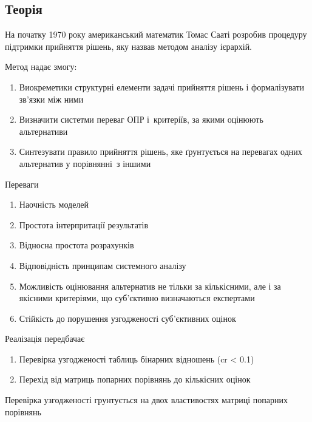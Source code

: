 \subsection{Теорія}
\label{subsec:saaty/theory}

На початку 1970 року американський математик Томас Сааті розробив
процедуру підтримки прийняття рішень, яку назвав методом аналізу ієрархій.

Метод надає змогу:

\begin{enumerate}
    \item Виокреметики структурні елементи задачі прийняття рішень
          і формалізувати зв'язки між ними
    \item Визначити систетми переваг ОПР і критеріїв,
          за якими оцінюють альтернативи
    \item Синтезувати правило прийняття рішень, яке ґрунтується на перевагах
          одних альтернатив у порівнянні з іншими
\end{enumerate}

Переваги

\begin{enumerate}
    \item Наочність моделей
    \item Простота інтерпритації результатів
    \item Відносна простота розрахунків
    \item Відповідність принципам системного аналізу
    \item Можливість оцінювання альтернатив не тільки за кількісними,
          але і за якісними критеріями, що суб'єктивно визначаються експертами
    \item Стійкість до порушення узгодженості суб'єктивних оцінок
\end{enumerate}

Реалізація передбачає

\begin{enumerate}
    \item Перевірка узгодженості таблиць бінарних відношень (cr < 0.1)
    \item Перехід від матриць попарних порівнянь до кількісних оцінок
\end{enumerate}

Перевірка узгодженості грунтується на двох властивостях матриці попарних порівнянь

